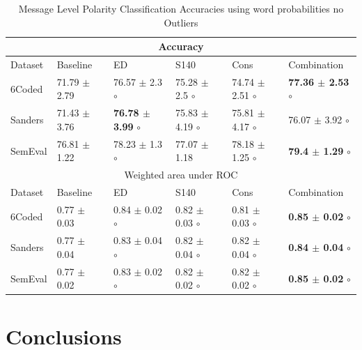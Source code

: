 \documentclass{sig-alternate}
\begin{document}
\begin{table}[htbp]
\begin{center}
\begin{tabular}{l|l|l|l|l|l}
\hline
\hline
\multicolumn{ 6}{c}{Accuracy } \\ \hline \hline
Dataset & Baseline & ED & S140 & Cons & Combination \\ \hline
6Coded & 71.79 $\pm$ 2.79 & 76.57 $\pm$ 2.3 $\circ$ & 75.28 $\pm$ 2.5 $\circ$ & 74.74 $\pm$ 2.51 $\circ$ & \textbf{77.36 $\pm$ 2.53} $\circ$ \\ 
Sanders & 71.43 $\pm$ 3.76 & \textbf{76.78 $\pm$ 3.99} $\circ$ & 75.83 $\pm$ 4.19 $\circ$ & 75.81 $\pm$ 4.17 $\circ$ & 76.07 $\pm$ 3.92 $\circ$ \\ 
SemEval & 76.81 $\pm$ 1.22 & 78.23 $\pm$ 1.3 $\circ$ & 77.07 $\pm$ 1.18 & 78.18 $\pm$ 1.25 $\circ$ & \textbf{79.4 $\pm$ 1.29} $\circ$ \\ \hline \hline
\multicolumn{ 6}{c}{Weighted area under ROC } \\ \hline \hline
Dataset & Baseline & ED & S140 & Cons & Combination \\ \hline 
6Coded & 0.77 $\pm$ 0.03 & 0.84 $\pm$ 0.02 $\circ$ & 0.82 $\pm$ 0.03 $\circ$ & 0.81 $\pm$ 0.03 $\circ$ & \textbf{0.85 $\pm$ 0.02} $\circ$ \\ 
Sanders & 0.77 $\pm$ 0.04 & 0.83 $\pm$ 0.04 $\circ$ & 0.82 $\pm$ 0.04 $\circ$ & 0.82 $\pm$ 0.04 $\circ$ & \textbf{0.84 $\pm$ 0.04} $\circ$ \\ 
SemEval & 0.77 $\pm$ 0.02 & 0.83 $\pm$ 0.02 $\circ$ & 0.82 $\pm$ 0.02 $\circ$ & 0.82 $\pm$ 0.02 $\circ$ & \textbf{0.85 $\pm$ 0.02} $\circ$ \\ \hline
\end{tabular}
\end{center}
\caption{Message Level Polarity Classification Accuracies using word probabilities no Outliers}
\label{}
\end{table}





\section{Conclusions}\label{sec:conc}




\end{document}
